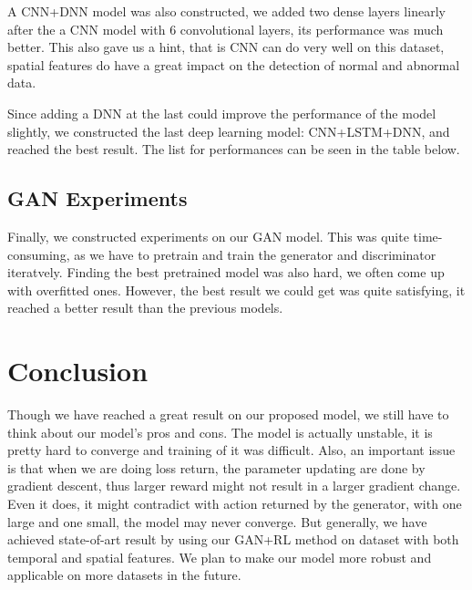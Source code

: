 \documentclass{acmtog} %
\begin{document}
A CNN+DNN model was also constructed, we added two dense layers linearly after the a CNN model with 6 convolutional layers, its performance was much better. This also gave us a hint, that is CNN can do very well on this dataset, spatial features do have a great impact on the detection of normal and abnormal data. 

Since adding a DNN at the last could improve the performance of the model slightly, we constructed the last deep learning model: CNN+LSTM+DNN, and reached the best result. The list for performances can be seen in the table below.

\begin{table}[h]
\end{table}

\subsection{GAN Experiments}
Finally, we constructed experiments on our GAN model. This was quite time-consuming, as we have to pretrain and train the generator and discriminator iteratvely. Finding the best pretrained model was also hard, we often come up with overfitted ones. However, the best result we could get was quite satisfying, it reached a better result than the previous models.

\section{Conclusion}
Though we have reached a great result on our proposed model, we still have to think about our model's pros and cons. The model is actually unstable, it is pretty hard to converge and training of it was difficult. Also, an important issue is that when we are doing loss return, the parameter updating are done by gradient descent, thus larger reward might not result in a larger gradient change. Even it does, it might contradict with action returned by the generator, with one large and one small, the model may never converge. But generally, we have achieved state-of-art result by using our GAN+RL method on dataset with both temporal and spatial features. We plan to make our model more robust and applicable on more datasets in the future.




\end{document}
